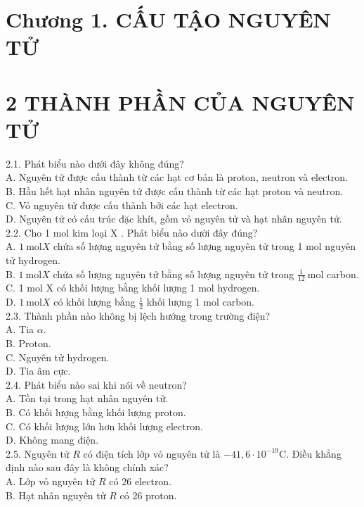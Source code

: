 \documentclass[10pt]{article}
\begin{document}
\section*{Chương 1. CẤU TẬO NGUYÊN TỬ}
\section*{2 THÀNH PHẦN CỦA NGUYÊN TỬ}
2.1. Phát biểu nào dưới đây không đúng?\\
A. Nguyên tử được cấu thành từ các hạt cơ bản là proton, neutron và electron.\\
B. Hầu hết hạt nhân nguyên tử được cấu thành từ các hạt proton và neutron.\\
C. Vỏ nguyên tử được cấu thành bởi các hạt electron.\\
D. Nguyên tử có cấu trúc đặc khít, gồm vỏ nguyên tử và hạt nhân nguyên tử.\\
2.2. Cho 1 mol kim loại X . Phát biểu nào dưới đây đúng?\\
A. $1 \mathrm{~mol} X$ chứa số lượng nguyên tử bằng số lượng nguyên tử trong 1 mol nguyên tử hydrogen.\\
B. $1 \mathrm{~mol} X$ chứa số lượng nguyên tử bằng số lượng nguyên tử trong $\frac{1}{12} \mathrm{~mol}$ carbon.\\
C. 1 mol X có khối lượng bằng khối lượng 1 mol hydrogen.\\
D. $1 \mathrm{~mol} X$ có khối lượng bằng $\frac{1}{2}$ khối lượng 1 mol carbon.\\
2.3. Thành phần nào không bị lệch hướng trong trường điện?\\
A. Tia $\alpha$.\\
B. Proton.\\
C. Nguyên tử hydrogen.\\
D. Tia âm cực.\\
2.4. Phát biểu nào sai khi nói về neutron?\\
A. Tồn tại trong hạt nhân nguyên tử.\\
B. Có khối lượng bằng khối lượng proton.\\
C. Có khối lượng lớn hơn khối lượng electron.\\
D. Không mang điện.\\
2.5. Nguyên tử $R$ có điện tích lớp vỏ nguyên tử là $-41,6 \cdot 10^{-19} \mathrm{C}$. Điều khẳng định nào sau đây là không chính xác?\\
A. Lớp vỏ nguyên tử $R$ có 26 electron.\\
B. Hạt nhân nguyên tử $R$ có 26 proton.\\
\end{document}
